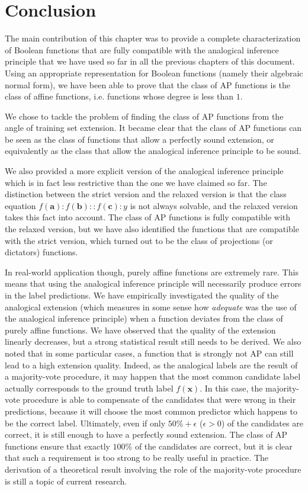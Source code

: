 \section*{Conclusion}

The main contribution of this chapter was to provide a complete
characterization of Boolean functions that are fully compatible with the
analogical inference principle that we have used so far in all the previous
chapters of this document. Using an appropriate representation for Boolean
functions (namely their algebraic normal form), we have been able to prove that
the class of AP functions is the class of affine functions, i.e. functions
whose degree is less than $1$.

We chose to tackle the problem of finding the class of AP functions from the
angle of training set extension. It became clear that the class of AP functions
can be seen as the class of functions that allow  a perfectly sound extension,
or equivalently as the class that allow the analogical inference principle to
be sound.

We also provided a more explicit version of the analogical inference principle
which is in fact less restrictive than the one we have claimed so far. The
distinction between the strict version and the relaxed version is that the
class equation $f(\mathbf{a}) : f(\mathbf{b}) ::f(\mathbf{c}) :y$ is not always
solvable, and the relaxed version takes this fact into account. The class of AP
functions is fully compatible with the relaxed version, but we have also
identified the functions that are compatible with the strict version, which
turned out to be the class of projections (or dictators) functions.

In real-world application though, purely affine functions are extremely rare.
This means that using the analogical inference principle will necessarily
produce errors in the label predictions. We have empirically investigated the
quality of the analogical extension (which measures in some sense how
\textit{adequate} was the use of the analogical inference principle) when a
function deviates from the class of purely affine functions. We have observed
that the quality of the extension linearly decreases, but a strong statistical
result still needs to be derived. We also noted that in some particular cases,
a function that is strongly not AP can still lead to a high extension quality.
Indeed, as the analogical labels are the result of a majority-vote procedure,
it may happen that the most common candidate label actually corresponds to the
ground truth label $f(\mathbf{x})$. In this case, the majority-vote procedure
is able to compensate of the candidates that were wrong in their predictions,
because it will choose the most common predictor which happens to be the
correct label.  Ultimately, even if only $50\% + \epsilon$ ($\epsilon > 0$) of
the candidates are correct, it is still enough to have a perfectly sound
extension. The class of AP functions ensure that exactly $100\%$ of the
candidates are correct, but it is clear that such a requirement is too strong
to be really useful in practice. The derivation of a theoretical result
involving the role  of the majority-vote procedure is still a topic of current
research.

